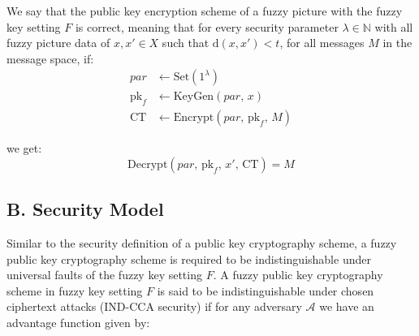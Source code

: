 \documentclass[graybox]{svmult}
\begin{document}
We say that the public key encryption scheme of a fuzzy picture with the fuzzy key setting \( F \) is correct, meaning that for every security parameter \( \lambda \in \mathbb{N} \) with all fuzzy picture data of \( x, x' \in X \) such that \( \mathrm{d}(x, x') < t \), for all messages \( M \) in the message space, if:
\begin{align*}
    par         & \leftarrow \text{Set}(1^\lambda)                    \\[6pt]
    \text{pk}_f & \leftarrow \text{KeyGen}(par ,\, x)                 \\[6pt]
    \text{CT}   & \leftarrow \text{Encrypt}(par ,\, \text{pk}_f,\, M)
\end{align*}

we get:
\[
    \text{Decrypt}(par ,\, \text{pk}_f,\, x',\, \text{CT}) = M
\]

\subsection*{B. Security Model}

Similar to the security definition of a public key cryptography scheme, a fuzzy public key cryptography scheme is required to be indistinguishable under universal faults of the fuzzy key setting \( F \).
A fuzzy public key cryptography scheme in fuzzy key setting \( F \) is said to be indistinguishable under chosen ciphertext attacks (IND-CCA security) if for any adversary \( \mathcal{A} \) we have an advantage function given by:
\end{document}

